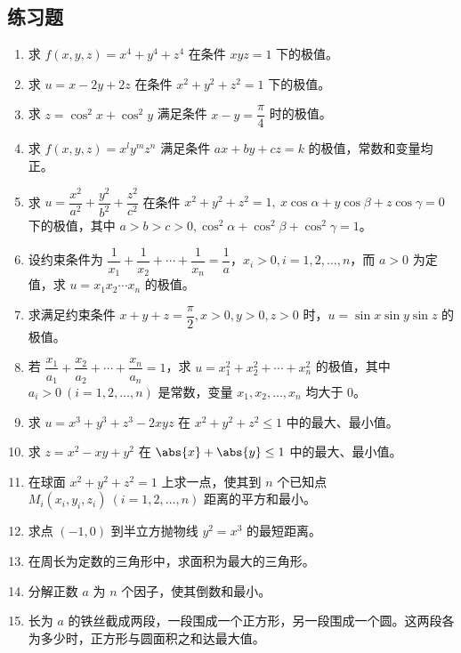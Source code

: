 \subsection{练习题}
\begin{xexercise}
\begin{enumerate}[label=\arabic*.]
  \item 求 $f(x,y,z)=x^4+y^4+z^4$ 在条件 $xyz=1$ 下的极值。
  \item 求 $u=x-2y+2z$ 在条件 $x^2+y^2+z^2=1$ 下的极值。
  \item 求 $z=\cos^2x+\cos^2y$ 满足条件 $x-y=\dfrac\pi4$ 时的极值。
  \item 求 $f(x,y,z)=x^ly^mz^n$ 满足条件 $ax+by+cz=k$ 的极值，常数和变量均正。
  \item 求 $u=\dfrac{x^2}{a^2}+\dfrac{y^2}{b^2}+\dfrac{z^2}{c^2}$ 在条件 $x^2+y^2+z^2=1,\ x\cos\alpha+y\cos\beta+z\cos\gamma=0$ 下的极值，其中 $a>b>c>0,\cos^2\alpha+\cos^2\beta+\cos^2\gamma=1$。
  \item 设约束条件为 $\dfrac1{x_1}+\dfrac1{x_2}+\cdots+\dfrac1{x_n}=\dfrac1a$，$x_i>0,i=1,2,\ldots,n$，而 $a>0$ 为定值，求 $u=x_1x_2\cdots x_n$ 的极值。
  \item 求满足约束条件 $x+y+z=\dfrac\pi2,x>0,y>0,z>0$ 时，$u=\sin x\sin y\sin z$ 的极值。
  \item 若 $\dfrac{x_1}{a_1}+\dfrac{x_2}{a_2}+\cdots+\dfrac{x_n}{a_n}=1$，求 $u=x_1^2+x_2^2+\cdots+x_n^2$ 的极值，其中 $a_i>0\ (i=1,2,\ldots,n)$ 是常数，变量 $x_1,x_2,\ldots,x_n$ 均大于 $0$。
  \item 求 $u=x^3+y^3+z^3-2xyz$ 在 $x^2+y^2+z^2\le1$ 中的最大、最小值。
  \item 求 $z=x^2-xy+y^2$ 在 $\abs{x}+\abs{y}\le1$ 中的最大、最小值。
  \item 在球面 $x^2+y^2+z^2=1$ 上求一点，使其到 $n$ 个已知点 $M_i(x_i,y_i,z_i)\ (i=1,2,\ldots,n)$ 距离的平方和最小。
  \item 求点 $(-1,0)$ 到半立方抛物线 $y^2=x^3$ 的最短距离。
  \item 在周长为定数的三角形中，求面积为最大的三角形。
  \item 分解正数 $a$ 为 $n$ 个因子，使其倒数和最小。
  \item 长为 $a$ 的铁丝截成两段，一段围成一个正方形，另一段围成一个圆。这两段各为多少时，正方形与圆面积之和达最大值。
\end{enumerate}
\end{xexercise}
